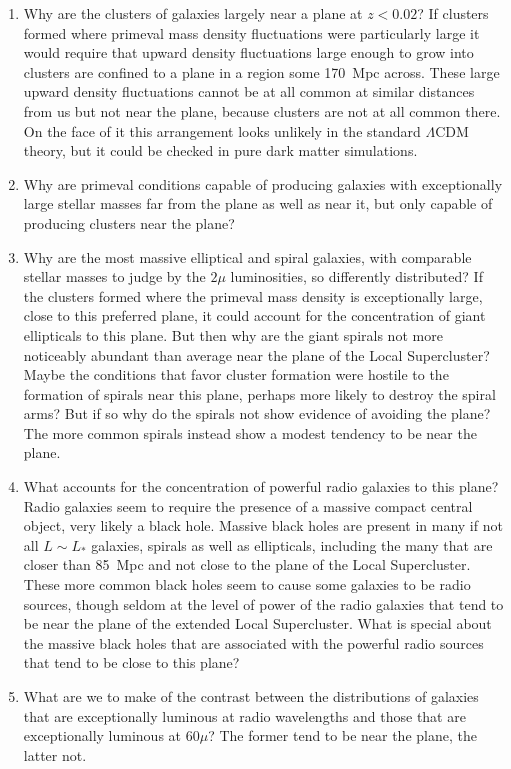 \documentclass[fleqn,12pt]{article}
\begin{document}
\begin{enumerate}[label*=\arabic*.]

\item  Why are the clusters of galaxies largely near a plane at $z<0.02$? If clusters formed where primeval mass density fluctuations were particularly large it would require that upward density fluctuations large enough to grow into clusters are confined to a plane in a region some 170~Mpc across. These large upward density fluctuations cannot be at all common at similar distances from us but not near the plane, because clusters are not at all common there. On the face of it this arrangement looks unlikely in the standard $\Lambda$CDM theory, but it could be checked in pure dark matter simulations.

\item Why are primeval conditions capable of producing galaxies with exceptionally large stellar masses far from the plane as well as near it, but only capable of producing clusters near the plane?

\item Why are the most massive elliptical and spiral galaxies, with comparable stellar masses to judge by the $2\mu$ luminosities, so differently distributed? If the clusters formed where the primeval mass density is exceptionally large, close to this preferred plane, it could account for the concentration of giant ellipticals to this plane. But then why are the giant spirals not more noticeably abundant than average near the plane of the Local Supercluster? Maybe the conditions that favor cluster formation were hostile to the formation of spirals near this plane, perhaps more likely to destroy the spiral arms? But if so why do the spirals not show evidence of avoiding the plane? The more common spirals instead show a modest tendency to be near the plane.

\item What accounts for the concentration of powerful radio galaxies to this plane? Radio galaxies seem to require the presence of a massive compact central object, very likely a black hole. Massive black holes are present in many if not all $L\sim L_\ast$ galaxies, spirals as well as ellipticals, including the many that are closer than 85~Mpc and not close to the plane of the Local Supercluster. These more common black holes seem to cause some galaxies to be radio sources, though seldom at the level of power of the radio galaxies that tend to be near the plane of the extended Local Supercluster. What is special about the massive black holes that are associated with the powerful radio sources that tend to be close to this plane?

\item What are we to make of the contrast between the distributions of galaxies that are exceptionally luminous  at radio wavelengths and those that are exceptionally luminous at $60\mu$? The former tend to be near the plane, the latter not. 

\end{enumerate}
\end{document}

